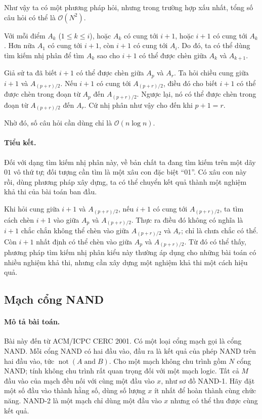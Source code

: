 \documentclass[11pt]{article}
\newcommand{\Oh}{\mathcal{O}}
\begin{document}
Như vậy ta có một phương pháp hỏi, nhưng trong trường hợp xấu nhất, tổng số
câu hỏi có thể là $\Oh(N^2)$.

Với mỗi điểm $A_k$ ($1\le k\le i$), hoặc $A_k$ có cung tới $i+1$, hoặc $i+1$
có cung tới $A_k$. Hơn nữa $A_1$ có cung tới $i+1$, còn $i+1$ có cung tới
$A_i$. Do đó, ta có thể dùng tìm kiếm nhị phân để tìm $A_k$ sao cho $i+1$ có
thể được chèn giữa $A_k$ và $A_{k+1}$.

Giả sử ta đã biết $i+1$ có thể được chèn giữa $A_p$ và $A_r$. Ta hỏi chiều
cung giữa $i+1$ và $A_{(p+r)/2}$. Nếu $i+1$ có cung tới $A_{(p+r)/2}$, điều
đó cho biết $i+1$ có thể được chèn trong đoạn từ $A_p$ đến $A_{(p+r)/2}$.
Ngược lại, nó có thể được chèn trong đoạn từ $A_{(p+r)/2}$ đến $A_r$. Cứ nhị
phân như vậy cho đến khi $p+1=r$.

Nhờ đó, số câu hỏi cần dùng chỉ là $\Oh(n\log n)$.

\paragraph{Tiểu kết.}
Đối với dạng tìm kiếm nhị phân này, về bản chất ta đang tìm kiếm trên một dãy
$01$ vô thứ tự; đối tượng cần tìm là một xâu con đặc biệt ``01''. Có xâu con
này rồi, dùng phương pháp xây dựng, ta có thể chuyển kết quả thành một nghiệm
khả thi của bài toán ban đầu.

Khi hỏi cung giữa $i+1$ và $A_{(p+r)/2}$, nếu $i+1$ có cung tới
$A_{(p+r)/2}$, ta tìm cách chèn $i+1$ vào giữa $A_p$ và $A_{(p+r)/2}$. Thực ra
điều đó không có nghĩa là $i+1$ chắc chắn không thể chèn vào giữa
$A_{(p+r)/2}$ và $A_r$; chỉ là chưa chắc có thể. Còn $i+1$ nhất định có thể
chèn vào giữa $A_p$ và $A_{(p+r)/2}$. Từ đó có thể thấy, phương pháp tìm kiếm
nhị phân kiểu này thường áp dụng cho những bài toán có nhiều nghiệm khả thi,
nhưng cần xây dựng một nghiệm khả thi một cách hiệu quả.

\subsection{Mạch cổng NAND}

\paragraph{Mô tả bài toán.}
Bài này đến từ ACM/ICPC CERC 2001. Có một loại cổng mạch gọi là cổng NAND.
Mỗi cổng NAND có hai đầu vào, đầu ra là kết quả của phép NAND trên hai đầu
vào, tức $\operatorname{not}(A\operatorname{and}B)$. Cho một mạch không chu
trình gồm $N$ cổng NAND; tính không chu trình rất quan trọng đối với một mạch
logic. Tất cả $M$ đầu vào của mạch đều nối với cùng một đầu vào $x$, như sơ đồ
NAND-1. Hãy đặt một số đầu vào thành hằng số, dùng số lượng $x$ ít nhất để
hoàn thành cùng chức năng. NAND-2 là một mạch chỉ dùng một đầu vào $x$ nhưng
có thể thu được cùng kết quả.
\end{document}
